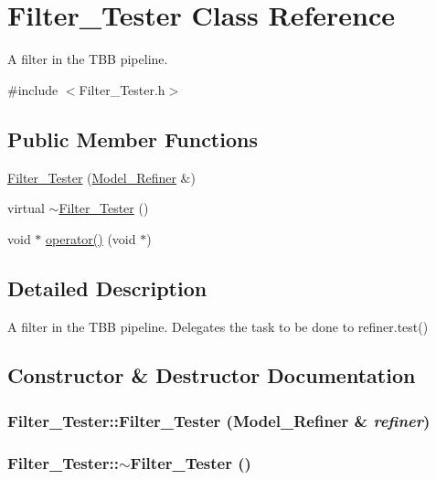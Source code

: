 \hypertarget{class_filter___tester}{
\section{Filter\_\-Tester Class Reference}
\label{class_filter___tester}
}


A filter in the TBB pipeline.  




{\ttfamily \#include $<$Filter\_\-Tester.h$>$}

\subsection*{Public Member Functions}
\begin{DoxyCompactItemize}
\item 
\hyperlink{class_filter___tester_acfc26771a968163043fc08d146254066}{Filter\_\-Tester} (\hyperlink{class_model___refiner}{Model\_\-Refiner} \&)
\item 
virtual \hyperlink{class_filter___tester_a8626a399afffab422fab557f98ca53cb}{$\sim$Filter\_\-Tester} ()
\item 
void $\ast$ \hyperlink{class_filter___tester_a9c204f911facc101baac1bc79d617133}{operator()} (void $\ast$)
\end{DoxyCompactItemize}


\subsection{Detailed Description}
A filter in the TBB pipeline. Delegates the task to be done to refiner.test() 

\subsection{Constructor \& Destructor Documentation}
\hypertarget{class_filter___tester_acfc26771a968163043fc08d146254066}{
\subsubsection[{Filter\_\-Tester}]{\setlength{\rightskip}{0pt plus 5cm}Filter\_\-Tester::Filter\_\-Tester ({\bf Model\_\-Refiner} \& {\em refiner})}}
\label{class_filter___tester_acfc26771a968163043fc08d146254066}
\hypertarget{class_filter___tester_a8626a399afffab422fab557f98ca53cb}{
\subsubsection[{$\sim$Filter\_\-Tester}]{\setlength{\rightskip}{0pt plus 5cm}Filter\_\-Tester::$\sim$Filter\_\-Tester ()}}
\label{class_filter___tester_a8626a399afffab422fab557f98ca53cb}


